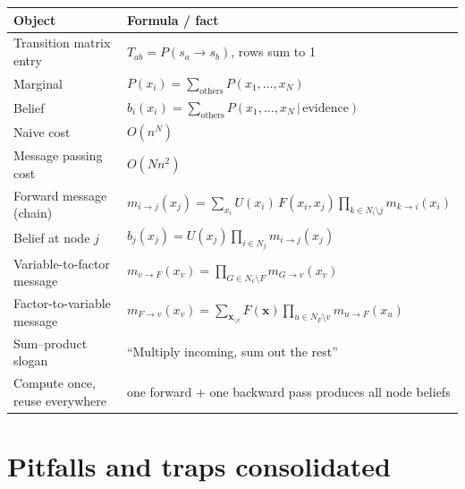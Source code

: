 \documentclass[11pt, a4paper]{article}
\newcommand{\thead}[1]{\textbf{#1}}
\begin{document}
\begin{tabularx}{\linewidth}{@{}lX@{}}
\toprule
\thead{Object} & \thead{Formula / fact} \\
\midrule
Transition matrix entry          & $T_{ab} = P(s_a \to s_b)$, rows sum to 1 \\
Marginal                          & $P(x_i) = \sum_{\text{others}} P(x_1, \ldots, x_N)$ \\
Belief                            & $b_i(x_i) = \sum_{\text{others}} P(x_1, \ldots, x_N \,|\, \text{evidence})$ \\
Naive cost                        & $O(n^N)$ \\
Message passing cost              & $O(N n^2)$ \\
Forward message (chain)           & $m_{i\to j}(x_j) = \sum_{x_i} U(x_i)\,F(x_i, x_j)\prod_{k\in N_i\setminus j}m_{k\to i}(x_i)$ \\
Belief at node $j$                & $b_j(x_j) = U(x_j)\prod_{i\in N_j} m_{i\to j}(x_j)$ \\
Variable-to-factor message        & $m_{v\to F}(x_v) = \prod_{G\in N_v\setminus F} m_{G\to v}(x_v)$ \\
Factor-to-variable message        & $m_{F\to v}(x_v) = \sum_{\mathbf{x}_{\setminus v}} F(\mathbf{x})\prod_{u\in N_F\setminus v} m_{u\to F}(x_u)$ \\
Sum--product slogan               & ``Multiply incoming, sum out the rest'' \\
Compute once, reuse everywhere    & one forward + one backward pass produces all node beliefs \\
\bottomrule
\end{tabularx}

\section*{Pitfalls and traps consolidated}
\end{document}
